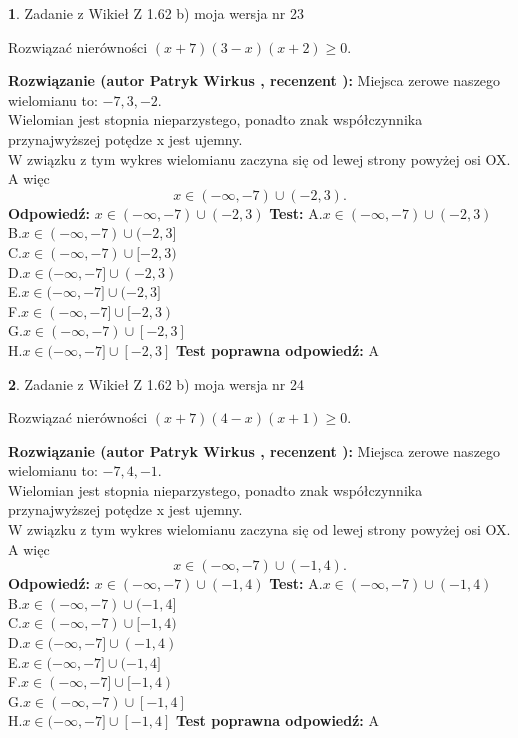 \documentclass[12pt, a4paper]{article}
\theoremstyle{definition} %
\newtheorem{zad}{}
\newcommand{\zadStart}[1]{\begin{zad}#1\newline}
\newcommand{\zadStop}{\end{zad}}
\newcommand{\rozwStart}[2]{\noindent \textbf{Rozwiązanie (autor #1 , recenzent #2): }\newline}
\newcommand{\rozwStop}{\newline}
\newcommand{\odpStart}{\noindent \textbf{Odpowiedź:}\newline}
\newcommand{\odpStop}{\newline}
\newcommand{\testStart}{\noindent \textbf{Test:}\newline}
\newcommand{\testStop}{\newline}
\newcommand{\kluczStart}{\noindent \textbf{Test poprawna odpowiedź:}\newline}
\newcommand{\kluczStop}{\newline}
\begin{document}
\zadStart{Zadanie z Wikieł Z 1.62 b) moja wersja nr 23}

Rozwiązać nierówności $(x+7)(3-x)(x+2)\ge0$.
\zadStop
\rozwStart{Patryk Wirkus}{}
Miejsca zerowe naszego wielomianu to: $-7, 3, -2$.\\
Wielomian jest stopnia nieparzystego, ponadto znak współczynnika przy\linebreak najwyższej potędze x jest ujemny.\\ W związku z tym wykres wielomianu zaczyna się od lewej strony powyżej osi OX. A więc $$x \in (-\infty,-7) \cup (-2,3).$$
\rozwStop
\odpStart
$x \in (-\infty,-7) \cup (-2,3)$
\odpStop
\testStart
A.$x \in (-\infty,-7) \cup (-2,3)$\\
B.$x \in (-\infty,-7) \cup (-2,3]$\\
C.$x \in (-\infty,-7) \cup [-2,3)$\\
D.$x \in (-\infty,-7] \cup (-2,3)$\\
E.$x \in (-\infty,-7] \cup (-2,3]$\\
F.$x \in (-\infty,-7] \cup [-2,3)$\\
G.$x \in (-\infty,-7) \cup [-2,3]$\\
H.$x \in (-\infty,-7] \cup [-2,3]$
\testStop
\kluczStart
A
\kluczStop



\zadStart{Zadanie z Wikieł Z 1.62 b) moja wersja nr 24}

Rozwiązać nierówności $(x+7)(4-x)(x+1)\ge0$.
\zadStop
\rozwStart{Patryk Wirkus}{}
Miejsca zerowe naszego wielomianu to: $-7, 4, -1$.\\
Wielomian jest stopnia nieparzystego, ponadto znak współczynnika przy\linebreak najwyższej potędze x jest ujemny.\\ W związku z tym wykres wielomianu zaczyna się od lewej strony powyżej osi OX. A więc $$x \in (-\infty,-7) \cup (-1,4).$$
\rozwStop
\odpStart
$x \in (-\infty,-7) \cup (-1,4)$
\odpStop
\testStart
A.$x \in (-\infty,-7) \cup (-1,4)$\\
B.$x \in (-\infty,-7) \cup (-1,4]$\\
C.$x \in (-\infty,-7) \cup [-1,4)$\\
D.$x \in (-\infty,-7] \cup (-1,4)$\\
E.$x \in (-\infty,-7] \cup (-1,4]$\\
F.$x \in (-\infty,-7] \cup [-1,4)$\\
G.$x \in (-\infty,-7) \cup [-1,4]$\\
H.$x \in (-\infty,-7] \cup [-1,4]$
\testStop
\kluczStart
A
\kluczStop
\end{document}
